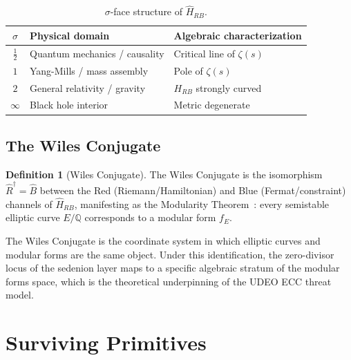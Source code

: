 \documentclass[runningheads]{llncs}
\theoremstyle{plain}
\theoremstyle{definition}
\newtheorem{definition}[theorem]{Definition}
\begin{document}
\begin{table}[h]
\centering
\caption{$\sigma$-face structure of $\hat{H}_{RB}$.}
\label{tab:sigma}
\begin{tabular}{cll}
\toprule
$\sigma$ & Physical domain & Algebraic characterization \\
\midrule
$\frac{1}{2}$ & Quantum mechanics / causality & Critical line of $\zeta(s)$ \\
$1$ & Yang-Mills / mass assembly & Pole of $\zeta(s)$ \\
$2$ & General relativity / gravity & $H_{RB}$ strongly curved \\
$\infty$ & Black hole interior & Metric degenerate \\
\bottomrule
\end{tabular}
\end{table}

\subsection{The Wiles Conjugate}

\begin{definition}[Wiles Conjugate]
\label{def:wiles}
The Wiles Conjugate is the isomorphism
$\hat{R}^\dagger = \hat{B}$ between the Red (Riemann/Hamiltonian) and
Blue (Fermat/constraint) channels of $\hat{H}_{RB}$, manifesting as
the Modularity Theorem~\cite{Wiles1995,TaylorWiles1995}:
every semistable elliptic curve $E/\mathbb{Q}$ corresponds to a modular form $f_E$.
\end{definition}

The Wiles Conjugate is the coordinate system in which elliptic curves and
modular forms are the same object. Under this identification, the
zero-divisor locus of the sedenion layer maps to a specific algebraic
stratum of the modular forms space, which is the theoretical underpinning
of the UDEO ECC threat model.


\section{Surviving Primitives}
\label{sec:surviving}
\end{document}
